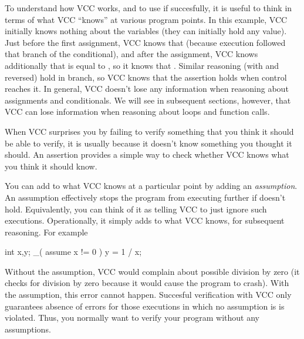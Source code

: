 To understand how VCC works, and to use if succesfully, it is useful to
think in terms of what VCC ``knows'' at various program points. In
this example, VCC initially knows nothing about the variables (they
can initially hold any value). Just before the first assignment, VCC knows that 
 (because execution followed that branch of the conditional), and
after the assignment, VCC knows additionally that  is equal to
, so it knows that . Similar reasoning
(with  and  reversed) hold in  branch, so VCC
knows that the assertion holds when control reaches it. In general,
VCC doesn't lose any information when reasoning about assignments and
conditionals. We will see in subsequent sections, however, that VCC
can lose information when reasoning about loops and function calls.

When VCC surprises you by failing to verify something that you think
it should be able to verify, it is usually because it doesn't know
something you thought it should. An assertion provides a simple way to
check whether VCC knows what you think it should know.

You can add to what VCC knows at a particular point by adding an
\emph{assumption}. An assumption  effectively stops
the program from executing further if  doesn't
hold. Equivalently, you can think of it as telling VCC to just ignore
such executions. Operationally, it simply adds  to what VCC
knows, for subsequent reasoning. For example
\begin{VCC}
  int x,y;
  _( assume x != 0 )
  y = 1 / x;
\end{VCC}

Without the assumption, VCC would complain about possible division by
zero (it checks for division by zero because it would cause the
program to crash).  With the assumption, this error cannot happen.
Succesful verification with VCC only guarantees absence of errors for
those executions in which no assumption is is violated. Thus, you
normally want to verify your program without any assumptions.

